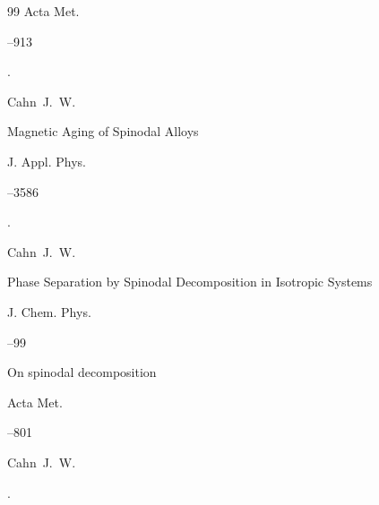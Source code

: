 \begin{thebibliography}{99}
\jour Acta Met.




--913


\moreref 

. \nofrills






\by Cahn~J.~W.

\paper Magnetic Aging of Spinodal Alloys

\jour J. Appl. Phys.




--3586


\moreref {}. \nofrills






\by Cahn~J.~W.

\paper Phase Separation by Spinodal Decomposition in Isotropic Systems

\jour J. Chem. Phys.




--99









\paper On spinodal decomposition



\jour Acta Met.


--801

\by Cahn~J.~W.


\moreref 

.\nofrills




\end{thebibliography}
